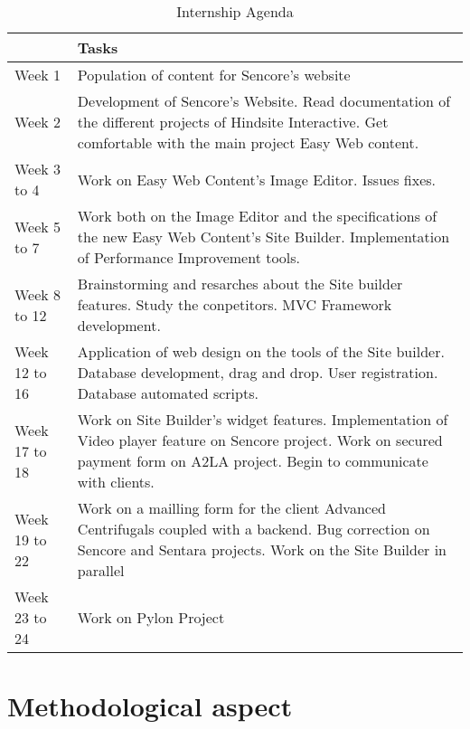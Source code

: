 \begin{table}[!ht]
	\caption{\label{tableau:agenda}Internship Agenda}
	\begin{tabular}{ | l | p{12cm} | }
		\hline
		 & Tasks\\
		\hline
		Week 1	&	Population of content for Sencore's website\\	\hline
		Week 2	&	Development of Sencore's Website. Read documentation of the different projects of Hindsite Interactive. Get comfortable with the main project Easy Web content.\\	\hline
		Week 3 to 4	&	Work on Easy Web Content's Image Editor. Issues fixes.\\	\hline
		Week 5 to 7	&	Work both on the Image Editor and the specifications of the new Easy Web Content's Site Builder. Implementation of Performance Improvement tools.\\	\hline
		Week 8 to 12	&	Brainstorming and resarches about the Site builder features. Study the conpetitors. MVC Framework development.\\	\hline
		Week 12 to 16	&	Application of web design on the tools of the Site builder. Database development, drag and drop. User registration. Database automated scripts.	\\	\hline
		Week 17	to 18&	Work on Site Builder's widget features. Implementation of Video player feature on Sencore project. Work on secured payment form on A2LA project. Begin to communicate with clients.\\	\hline
		Week 19	to 22 &	Work on a mailling form for the client Advanced Centrifugals coupled with a backend. Bug correction on Sencore and Sentara projects. Work on the Site Builder in parallel\\	\hline
		Week 23	to 24&	Work on Pylon Project\\	\hline
	\end{tabular}
\end{table}

\section{Methodological aspect}


